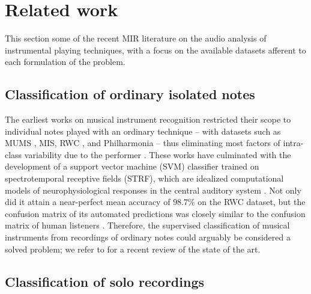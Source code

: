 \documentclass{article}
\begin{document}
\section{Related work}
This section some of the recent MIR literature on the audio analysis of instrumental playing techniques,
with a focus on the available datasets afferent to each formulation of the problem.

\subsection{Classification of ordinary isolated notes}
The earliest works on musical instrument recognition restricted their scope to individual notes played with an ordinary technique -- with datasets such as MUMS \cite{opolko1989dataset}, MIS, RWC \cite{goto2003ismir}, and Philharmonia -- thus eliminating most factors of intra-class variability due to the performer  \cite{martin1998asa,brown1999jasa,eronen2000icassp,herrera2003jnmr,wieczorkowska2003jiis,kaminskyj2005jiis,benetos2006icassp}.
These works have culminated with the development of a support vector machine (SVM) classifier trained on spectrotemporal receptive fields (STRF), which are idealized computational models of neurophysiological responses in the central auditory system \cite{chi2005jasa}.
Not only did it attain a near-perfect mean accuracy of $98.7\%$ on the RWC dataset, but the confusion matrix of its automated predictions was closely similar to the confusion matrix of human listeners \cite{patil2012plos}.
Therefore, the supervised classification of musical instruments from recordings of ordinary notes could arguably be considered a solved problem; we refer to \cite{bhalke2016jiis} for a recent review of the state of the art.

\subsection{Classification of solo recordings}
\end{document}
